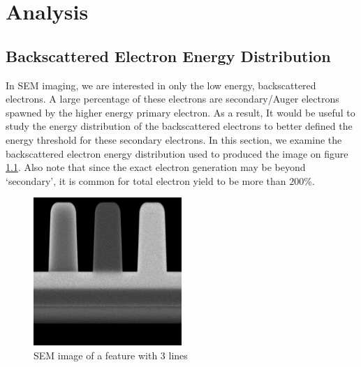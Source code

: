 \chapter{Analysis}

\section{Backscattered Electron Energy Distribution}
In SEM imaging, we are interested in only the low energy, backscattered electrons. A large percentage of these electrons are secondary/Auger electrons spawned by the higher energy primary electron. As a result, It would be useful to study the energy distribution of the backscattered electrons to better defined the energy threshold for these secondary electrons. In this section, we examine the backscattered electron energy distribution used to produced the image on figure \ref{fig:base}. Also note that since the exact electron generation may be beyond `secondary', it is common for total electron yield to be more than $200\%$. 
\begin{figure}[h]
\begin{center}
\includegraphics[width=0.5\textwidth]{img/output0.png}
\caption{\label{fig:base}SEM image of a feature with 3 lines}
\end{center}
\end{figure}

